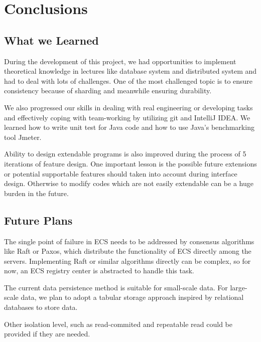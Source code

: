 \documentclass[sigconf]{acmart}
\begin{document}
\section{Conclusions}
\subsection{What we Learned}

During the development of this project, we had opportunities to implement theoretical knowledge in lectures like database system and distributed system and had to deal with lots of challenges. One of the most challenged topic is to ensure consistency because of sharding and meanwhile ensuring durability.

We also progressed our skills in dealing with real engineering or developing tasks and effectively coping with team-working by utilizing git and IntelliJ IDEA. We learned how to write unit test for Java code and how to use Java's benchmarking tool Jmeter.

Ability to design extendable programs is also improved during the process of 5 iterations of feature design. One important lesson is the possible future extensions or potential supportable features should taken into account during interface design. Otherwise to modify codes which are not easily extendable can be a huge burden in the future.

\subsection{Future Plans}

The single point of failure in ECS needs to be addressed by consensus algorithms like Raft or Paxos, which distribute the functionality of ECS directly among the servers. Implementing Raft or similar algorithms directly can be complex, so for now, an ECS registry center is abstracted to handle this task.

The current data persistence method is suitable for small-scale data. For large-scale data, we plan to adopt a tabular storage approach inspired by relational databases to store data.

Other isolation level, such as read-commited and repeatable read could be provided if they are needed.








\appendix
\end{document}
